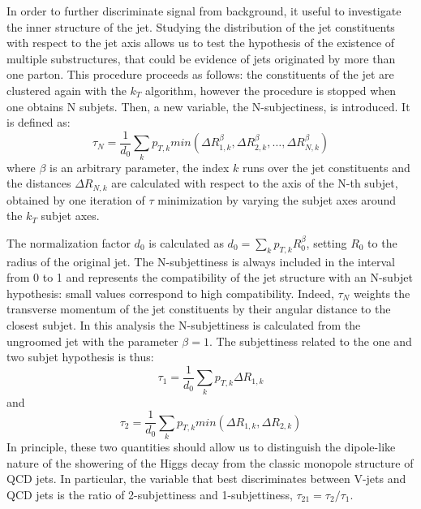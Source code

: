 In order to further discriminate signal from background, it useful to investigate the inner structure of the jet. Studying the distribution of the jet constituents with respect to the jet axis allows us to test the hypothesis of the existence of multiple substructures, that could be evidence of jets originated by more than one parton. This procedure proceeds as follows: the constituents of the jet are clustered again with the $k_T$ algorithm, however the procedure is stopped when one obtains N subjets. 
Then, a new variable, the N-subjectiness, is introduced. It is defined as:
$$\tau_N = \frac{1}{d_0} \sum_k p_{T,k} min( \Delta R_{1,k}^\beta, \Delta R_{2,k}^\beta, \dots, \Delta R_{N,k}^\beta )$$
where $\beta$ is an arbitrary parameter, the index $k$ runs over the jet constituents and the distances $\Delta R_{N,k}$ are calculated with respect to the axis of the N-th subjet, obtained by one iteration of $\tau$ minimization by varying the subjet axes around the $k_T$ subjet axes.

The normalization factor $d_0$ is calculated as $d_0 = \sum_k p_{T, k} R_0^\beta$, setting $R_0$ to the radius of the original jet.
The N-subjettiness is always included in the interval from 0 to 1 and represents the compatibility of the jet structure with an N-subjet hypothesis: small values correspond to high compatibility. Indeed, $\tau_N$ weights the transverse momentum of the jet constituents by their angular distance to the closest subjet.
In this analysis the N-subjettiness is calculated from the ungroomed jet with the parameter $\beta=1$. The subjettiness related to the one and two subjet hypothesis is thus:
$$\tau_1 = \frac{1}{d_0} \sum_k p_{T,k} \Delta R_{1,k}$$
and
$$\tau_2 = \frac{1}{d_0} \sum_k p_{T,k} min( \Delta R_{1,k}, \Delta R_{2,k} )$$
In principle, these two quantities should allow us to distinguish the dipole-like
nature of the showering of the Higgs decay from the classic monopole structure of
QCD jets. In particular, the variable that best discriminates between V-jets and
QCD jets is the ratio of 2-subjettiness and 1-subjettiness, $\tau_{21} = \tau_2 / \tau_1$.

